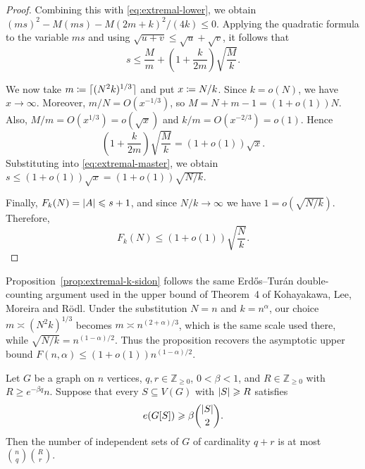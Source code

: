 \documentclass[reqno,a4paper,12pt]{amsart}
\begin{document}
\begin{proof}
    Combining this with \eqref{eq:extremal-lower}, we obtain
    \((ms)^2-M(ms) - M(2m+k)^2/(4k) \leq0\).
    Applying the quadratic formula to the variable \(ms\) and using
    \(\sqrt{u+v}\leq\sqrt u+\sqrt v\), it follows that
    \begin{equation}
        \label{eq:extremal-master}
        s
        \leq
        \frac Mm
        +
        \left(
        1+\frac{k}{2m}
        \right)
        \sqrt{\frac Mk}.
    \end{equation}

    We now take \(m \mathrel{\coloneqq} \lceil(N^2k)^{1/3}\rceil\) and put
    \(x\mathrel{\coloneqq} N/k\).
    Since \(k=o(N)\), we have \(x\to\infty\).
    Moreover, \(m/N = O(x^{-1/3})\), so
    \(M = N+m-1 = (1+o(1))N\).
    Also, \(M/m = O(x^{1/3}) = o(\sqrt{x})\) and
    \(k/m = O(x^{-2/3}) = o(1)\).
    Hence
    \[
        \left(
        1+\frac{k}{2m}
        \right)
        \sqrt{\frac Mk}
        =
        (1+o(1))\sqrt{x}.
    \]
    Substituting into \eqref{eq:extremal-master}, we obtain
    \(s \leq (1+o(1))\sqrt{x} = (1+o(1))\sqrt{N/k}\).

    Finally, \(F_k(N)=\lvert A\rvert\leqslant s+1\), and since
    \(N/k\to\infty\) we have \(1=o(\sqrt{N/k})\).
    Therefore,
    \[
        F_k(N)
        \leq
        (1+o(1))\sqrt{\frac Nk}.
    \]
\end{proof}
\begin{remark}
    Proposition~\ref{prop:extremal-k-sidon} follows the same
    Erd\H{o}s--Tur\'an double-counting argument used in the upper bound
    of Theorem~4 of Kohayakawa, Lee, Moreira and R\"odl. Under the
    substitution \(N=n\) and \(k=n^\alpha\),
    our choice \(m\asymp (N^2k)^{1/3}\)
    becomes \(m\asymp n^{(2+\alpha)/3}\),
    which is the same scale used there, while
    \(\sqrt{N/k} = n^{(1-\alpha)/2}\).
    Thus the proposition recovers the asymptotic upper bound
    \(F(n,\alpha) \leq (1+o(1))n^{(1-\alpha)/2}\).
\end{remark}

\begin{proposition}
    \label{prop:graph-containers}
    Let \(G\) be a graph on \(n\) vertices, \(q,r\in\mathbb Z_{\geq0}\), \(0<\beta<1\), and \(R\in\mathbb Z_{\geq0}\) with \(R\geq e^{-\beta q}n\).
    Suppose that every \(S\subseteq V(G)\) with \(\lvert S\rvert\geqslant R\) satisfies
    \[
        e(G[S])
        \geqslant
        \beta\binom{\lvert S\rvert}{2}.
    \]
    Then the number of independent sets of \(G\) of cardinality
    \(q+r\) is at most \(\binom nq\binom Rr\).
\end{proposition}
\end{document}
